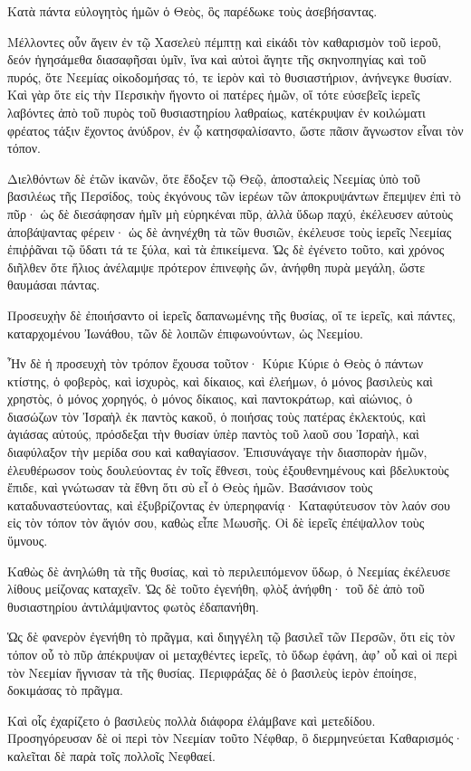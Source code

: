 {\par }{\PP {}Κατὰ πάντα εὐλογητὸς ἡμῶν ὁ Θεὸς, ὃς παρέδωκε τοὺς ἀσεβήσαντας.
\par }{\PP {}Μέλλοντες οὖν ἄγειν ἐν τῷ Χασελεὺ πέμπτῃ καὶ εἰκάδι τὸν καθαρισμὸν τοῦ ἱεροῦ, δεόν ἡγησάμεθα διασαφῆσαι ὑμῖν, ἵνα καὶ αὐτοὶ ἄγητε τῆς σκηνοπηγίας καὶ τοῦ πυρός, ὅτε Νεεμίας οἰκοδομήσας τό, τε ἱερὸν καὶ τὸ θυσιαστήριον, ἀνήνεγκε θυσίαν.
Καὶ γὰρ ὅτε εἰς τὴν Περσικὴν ἤγοντο οἱ πατέρες ἡμῶν, οἵ τότε εὐσεβεῖς ἱερεῖς λαβόντες ἀπὸ τοῦ πυρὸς τοῦ θυσιαστηρίου λαθραίως, κατέκρυψαν ἐν κοιλώματι φρέατος τάξιν ἔχοντος ἀνύδρον, ἐν ᾧ κατησφαλίσαντο, ὥστε πᾶσιν ἄγνωστον εἶναι τὸν τόπον.
\par }{\PP {}Διελθόντων δὲ ἐτῶν ἱκανῶν, ὅτε ἔδοξεν τῷ Θεῷ, ἀποσταλεὶς Νεεμίας ὑπὸ τοῦ βασιλέως τῆς Περσίδος, τοὺς ἐκγόνους τῶν ἱερέων τῶν ἀποκρυψάντων ἔπεμψεν ἐπὶ τὸ πῦρ·
ὡς δὲ διεσάφησαν ἡμῖν μὴ εὑρηκέναι πῦρ, ἀλλὰ ὕδωρ παχύ, ἐκέλευσεν αὐτοὺς ἀποβάψαντας φέρειν· ὡς δὲ ἀνηνέχθη τὰ τῶν θυσιῶν, ἐκέλευσε τοὺς ἱερεῖς Νεεμίας ἐπιῤῥᾶναι τῷ ὕδατι τά τε ξύλα, καὶ τὰ ἐπικείμενα.
Ὡς δὲ ἐγένετο τοῦτο, καὶ χρόνος διῆλθεν ὅτε ἥλιος ἀνέλαμψε πρότερον ἐπινεφὴς ὤν, ἀνήφθη πυρὰ μεγάλη, ὥστε θαυμάσαι πάντας.
\par }{\PP {}Προσευχὴν δὲ ἐποιήσαντο οἱ ἱερεῖς δαπανωμένης τῆς θυσίας, οἵ τε ἱερεῖς, καὶ πάντες, καταρχομένου Ἰωνάθου, τῶν δὲ λοιπῶν ἐπιφωνούντων, ὡς Νεεμίου.
\par }{\PP {}Ἦν δὲ ἡ προσευχὴ τὸν τρόπον ἔχουσα τοῦτον· Κύριε Κύριε ὁ Θεὸς ὁ πάντων κτίστης, ὁ φοβερὸς, καὶ ἰσχυρὸς, καὶ δίκαιος, καὶ ἐλεήμων, ὁ μόνος βασιλεὺς καὶ χρηστὸς,
ὁ μόνος χορηγός, ὁ μόνος δίκαιος, καὶ παντοκράτωρ, καὶ αἰώνιος, ὁ διασώζων τὸν Ἰσραὴλ ἐκ παντὸς κακοῦ, ὁ ποιήσας τοὺς πατέρας ἐκλεκτούς, καὶ ἁγιάσας αὐτούς,
πρόσδεξαι τὴν θυσίαν ὑπὲρ παντὸς τοῦ λαοῦ σου Ἰσραὴλ, καὶ διαφύλαξον τὴν μερίδα σου καὶ καθαγίασον.
Ἐπισυνάγαγε τὴν διασπορὰν ἡμῶν, ἐλευθέρωσον τοὺς δουλεύοντας ἐν τοῖς ἔθνεσι, τοὺς ἐξουθενημένους καὶ βδελυκτοὺς ἔπιδε, καὶ γνώτωσαν τὰ ἔθνη ὅτι σὺ εἶ ὁ Θεὸς ἡμῶν.
Βασάνισον τοὺς καταδυναστεύοντας, καὶ ἐξυβρίζοντας ἐν ὑπερηφανίᾳ·
Καταφύτευσον τὸν λαόν σου εἰς τὸν τόπον τὸν ἅγιόν σου, καθὼς εἶπε Μωυσῆς.
Οἱ δὲ ἱερεῖς ἐπέψαλλον τοὺς ὕμνους.
\par }{\PP {}Καθὼς δὲ ἀνηλώθη τὰ τῆς θυσίας, καὶ τὸ περιλειπόμενον ὕδωρ, ὁ Νεεμίας ἐκέλευσε λίθους μείζονας καταχεῖν.
Ὡς δὲ τοῦτο ἐγενήθη, φλὸξ ἀνήφθη· τοῦ δὲ ἀπὸ τοῦ θυσιαστηρίου ἀντιλάμψαντος φωτὸς ἐδαπανήθη.
\par }{\PP {}Ὡς δὲ φανερὸν ἐγενήθη τὸ πρᾶγμα, καὶ διηγγέλη τῷ βασιλεῖ τῶν Περσῶν, ὅτι εἰς τὸν τόπον οὗ τὸ πῦρ ἀπέκρυψαν οἱ μεταχθέντες ἱερεῖς, τὸ ὕδωρ ἐφάνη, ἀφʼ οὗ καὶ οἱ περὶ τὸν Νεεμίαν ἥγνισαν τὰ τῆς θυσίας.
Περιφράξας δὲ ὁ βασιλεὺς ἱερὸν ἐποίησε, δοκιμάσας τὸ πρᾶγμα.
\par }{\PP {}Καὶ οἷς ἐχαρίζετο ὁ βασιλεὺς πολλὰ διάφορα ἐλάμβανε καὶ μετεδίδου.
Προσηγόρευσαν δὲ οἱ περὶ τὸν Νεεμίαν τοῦτο Νέφθαρ, ὃ διερμηνεύεται Καθαρισμός· καλεῖται δὲ παρὰ τοῖς πολλοῖς Νεφθαεί.

}
